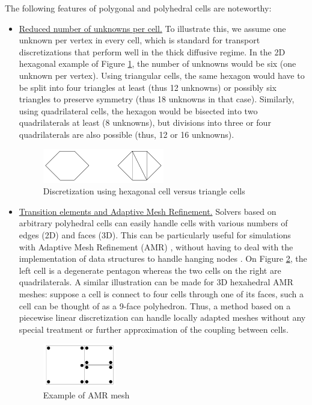The following features of polygonal and polyhedral cells are noteworthy:
\begin{itemize}
 \item \underline{Reduced number of unknowns per cell.} To illustrate this, we
   assume one unknown per vertex in every cell, which is standard for
   transport discretizations that perform well in the thick diffusive regime.
   In the 2D hexagonal example of Figure \ref{fig_hexa_split}, the number of
   unknowns would be six (one unknown per vertex). Using triangular cells, the
   same hexagon would have to be split into four triangles at least (thus 12
   unknowns) or possibly six triangles to preserve symmetry (thus 18 unknowns in
   that case). Similarly, using quadrilateral cells, the hexagon would be
   bisected into two quadrilaterals at least (8 unknowns), but divisions into
   three or four quadrilaterals are also possible (thus, 12 or 16 unknowns).
   \begin{figure}[H]
   \centering
   \includegraphics[width=0.5\textwidth]{./Dsa/hex_tri_cells}
   \caption{Discretization using hexagonal cell versus triangle cells}
   \label{fig_hexa_split}
   \end{figure}
 \item \underline{Transition elements and Adaptive Mesh Refinement.} Solvers
   based on arbitrary polyhedral cells can easily handle cells with various
   numbers of edges (2D) and faces (3D). This can be particularly useful for
   simulations with Adaptive Mesh Refinement (AMR)
   \cite{amr_block,amr_rad,amr_unstruc}, without having to deal with the
   implementation of data structures to handle hanging nodes
   \cite{locally_hanging_nodes,arbitrary_hanging_nodes,dealII_hanging_nodes}.
   On Figure \ref{fig_amr}, the left cell is a degenerate pentagon whereas the 
   two cells on the right are quadrilaterals. A similar illustration can be
   made for 3D hexahedral AMR meshes: suppose a cell is connect to four cells
   through one of its faces, such a cell can be
   thought of as a 9-face polyhedron. Thus, a method based on a piecewise linear
   discretization can handle locally adapted meshes without any special
   treatment or further approximation of the coupling between cells.
   \begin{figure}[H]
   \centering
   \includegraphics[width=0.3\textwidth]{./Dsa/amr}
   \caption{Example of AMR mesh}
   \label{fig_amr}
   \end{figure}
\end{itemize}
